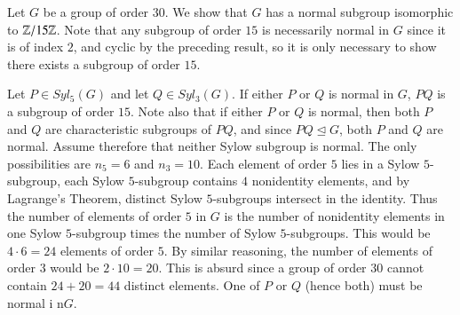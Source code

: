 \documentclass[12pt, a4paper, oneside, openright, titlepage]{book}
\begin{document}
\begin{eg}
    Let $G$ be a group of order $30$. We show that $G$ has a normal subgroup isomorphic to $\mathbb Z/15\mathbb Z$. Note that any subgroup of order $15$ is necessarily normal in $G$ since it is of index $2$, and cyclic by the preceding result, so it is only necessary to show there exists a subgroup of order $15$. 

    Let $P \in Syl_5(G)$ and let $Q \in Syl_3(G)$. If either $P$ or $Q$ is normal in $G$, $PQ$ is a subgroup of order $15$. Note also that if either $P$ or $Q$ is normal, then both $P$ and $Q$ are characteristic subgroups of $PQ$, and since $PQ \trianglelefteq G$, both $P$ and $Q$ are normal. Assume therefore that neither Sylow subgroup is normal. The only possibilities are $n_5 = 6$ and $n_3 = 10$. Each element of order $5$ lies in a Sylow $5$-subgroup, each Sylow $5$-subgroup contains $4$ nonidentity elements, and by Lagrange's Theorem, distinct Sylow $5$-subgroups intersect in the identity. Thus the number of elements of order $5$ in $G$ is the number of nonidentity elements in one Sylow $5$-subgroup times the number of Sylow $5$-subgroups. This would be $4\cdot 6 = 24$ elements of order $5$. By similar reasoning, the number of elements of order $3$ would be $2 \cdot 10 = 20$. This is absurd since a group of order $30$ cannot contain $24+20 = 44$ distinct elements. One of $P$ or $Q$ (hence both) must be normal i n$G$.
\end{eg}
\end{document}
